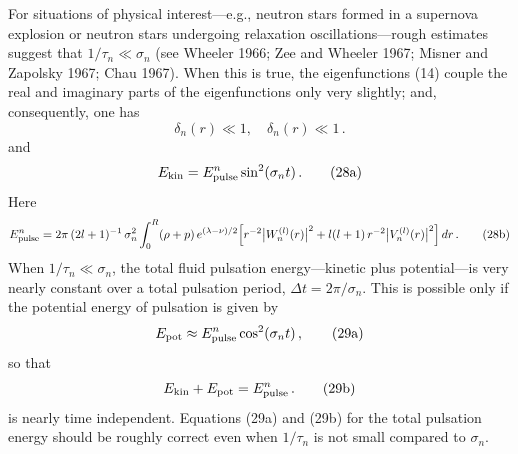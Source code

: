 For situations of physical interest---e.g., neutron stars formed in a supernova explosion or neutron stars undergoing relaxation oscillations---rough estimates suggest
that $1/\tau_n \ll \sigma_n$ (see Wheeler 1966; Zee and Wheeler 1967; Misner and Zapolsky 1967;
Chau 1967). When this is true, the eigenfunctions (14) couple the real and imaginary
parts of the eigenfunctions only very slightly; and, consequently, one has
%
\begin{equation}
\delta_n(r) \ll 1, \quad \delta_n(r) \ll 1 \,.
\tag{27}
\end{equation}
%
and
%
\begin{equation}
E_{\rm kin} = E_{\rm pulse}^n \sin^2(\sigma_n t) \,.
\tag{28a}
\end{equation}
%
Here
%
\begin{equation}
E_{\rm pulse}^n = 2\pi\,(2l+1)^{-1}\,\sigma_n^2
\int_0^R (\rho+p)\,e^{(\lambda-\nu)/2}
\Bigl[
r^{-2}\bigl|W_n^{(l)}(r)\bigr|^2
+ l(l+1)\,r^{-2}\bigl|V_n^{(l)}(r)\bigr|^2
\Bigr]\,dr \,.
\tag{28b}
\end{equation}
%
When $1/\tau_n \ll \sigma_n$, the total fluid pulsation energy---kinetic plus potential---is very
nearly constant over a total pulsation period, $\Delta t = 2\pi/\sigma_n$. This is possible only if the
potential energy of pulsation is given by
%
\begin{equation}
E_{\rm pot} \approx E_{\rm pulse}^n \cos^2(\sigma_n t) \,,
\tag{29a}
\end{equation}
%
so that
%
\begin{equation}
E_{\rm kin} + E_{\rm pot} = E_{\rm pulse}^n \,.
\tag{29b}
\end{equation}
%
is nearly time independent. Equations (29a) and (29b) for the total pulsation energy
should be roughly correct even when $1/\tau_n$ is not small compared to $\sigma_n$.
